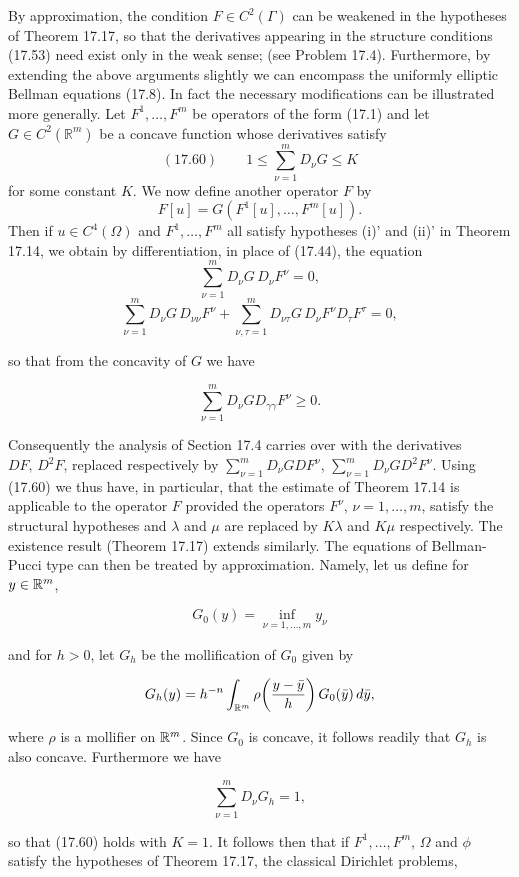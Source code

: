 By approximation, the condition $F \in C^2(\Gamma)$ can be weakened in the hypotheses of Theorem 17.17, so that the derivatives appearing in the structure conditions (17.53) need exist only in the weak sense; (see Problem 17.4). Furthermore, by extending the above arguments slightly we can encompass the uniformly elliptic Bellman equations (17.8). In fact the necessary modifications can be illustrated more generally. Let $F^1, \dots, F^m$ be operators of the form (17.1) and let $G \in C^2(\mathbb{R}^m)$ be a concave function whose derivatives satisfy
\[
(17.60)\qquad 1 \leq \sum_{\nu=1}^m D_\nu G \leq K
\]
for some constant $K$. We now define another operator $F$ by
\[
F[u] = G(F^1[u], \dots, F^m[u]).
\]
Then if $u \in C^4(\Omega)$ and $F^1, \dots, F^m$ all satisfy hypotheses (i)' and (ii)' in Theorem 17.14, we obtain by differentiation, in place of (17.44), the equation
\[
\sum_{\nu=1}^m D_\nu G\, D_\nu F^\nu = 0,
\]
\[
\sum_{\nu=1}^m D_\nu G\, D_{\nu\nu} F^\nu + \sum_{\nu,\tau=1}^m D_{\nu\tau} G\, D_\nu F^\nu D_\tau F^\tau = 0,
\]


so that from the concavity of $G$ we have

\[
\sum_{\nu=1}^m D_\nu G D_{\gamma\gamma}F^\nu \ge 0.
\]

Consequently the analysis of Section 17.4 carries over with the derivatives $DF,\, D^2F$,
replaced respectively by $\sum_{\nu=1}^m D_\nu GDF^\nu$, $\sum_{\nu=1}^m D_\nu GD^2F^\nu$. Using (17.60) we thus have, in
particular, that the estimate of Theorem 17.14 is applicable to the operator $F$
provided the operators $F^\nu$, $\nu = 1,\dots,m$, satisfy the structural hypotheses and $\lambda$
and $\mu$ are replaced by $K\lambda$ and $K\mu$ respectively. The existence result (Theorem 17.17)
extends similarly. The equations of Bellman-Pucci type can then be treated by
approximation. Namely, let us define for $y \in \mathbb{R}^m$,

\[
G_0(y)=\inf_{\nu=1,\dots,m} y_\nu
\]

and for $h>0$, let $G_h$ be the mollification of $G_0$ given by

\[
G_h(y)=h^{-n}\int_{\mathbb{R}^m}\rho\!\left(\frac{y-\bar y}{h}\right)G_0(\bar y)\,d\bar y,
\]

where $\rho$ is a mollifier on $\mathbb{R}^m$. Since $G_0$ is concave, it follows readily that $G_h$ is also
concave. Furthermore we have

\[
\sum_{\nu=1}^m D_\nu G_h = 1,
\]

so that (17.60) holds with $K=1$. It follows then that if $F^1,\dots,F^m$, $\Omega$ and $\phi$ satisfy
the hypotheses of Theorem 17.17, the classical Dirichlet problems,

